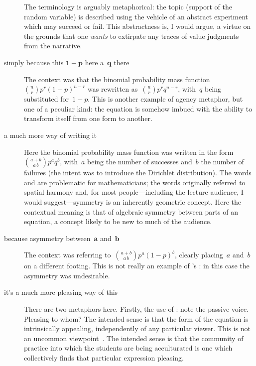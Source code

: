 \begin{description}
{  The terminology is arguably metaphorical: the topic (support of the
  random variable) is described using the vehicle of an abstract
  experiment which may succeed or fail.  This abstractness is, I would
  argue, a virtue on the grounds that one \emph{wants} to extirpate
  any traces of value judgments from the narrative.}

\item[simply because this $\mathbf{1-p}$ here \metaphor{turns into}
  a~$\mathbf{q}$ there]{The context was that the binomial probability
  mass function~${n\choose r}p^r(1-p)^{n-r}$ was rewritten
  as~${n\choose r}p^rq^{n-r}$, with~$q$ being substituted for~$1-p$.
  This is another example of agency metaphor, but one of a peculiar
  kind: the equation is somehow imbued with the ability to transform
  itself from one form to another.}

\item[a much more \metaphor{symmetric} way of writing it]{Here the
  binomial probability mass function was written in the
  form~${a+b\choose a\, b}p^aq^b$, with~$a$ being the number of
  successes and~$b$ the number of failures (the intent was to
  introduce the Dirichlet distribution).  The words 
  and  are problematic for mathematicians; the words
  originally referred to spatial harmony and, for most
  people---including the lecture audience, I would suggest---symmetry
  is an inherently geometric concept.  Here the contextual meaning is
  that of algebraic symmetry between parts of an equation, a concept
  likely to be new to much of the audience.}
\item[because \metaphor{we have} asymmetry between~$\mathbf{a}$
  and~$\mathbf{b}$]{The context was referring to~${a+b\choose
    a\,b}p^a(1-p)^b$, clearly placing~$a$ and~$b$ on a different
  footing.  This is not really an example of \citeauthor{pimm1984}'s
  : in this case the asymmetry was undesirable.}
\item[it's a much more pleasing way of \metaphor{handling} this]{There
  are two metaphors here.  Firstly, the use of : note
  the passive voice.  Pleasing to whom?  The intended sense is that
  the form of the equation is intrinsically appealing, independently
  of any particular viewer.  This is not an uncommon
  viewpoint~\citep{rota2011}.  The intended sense is that the
  community of practice into which the students are being acculturated
  is one which collectively finds that particular expression pleasing.

}
\end{description}
